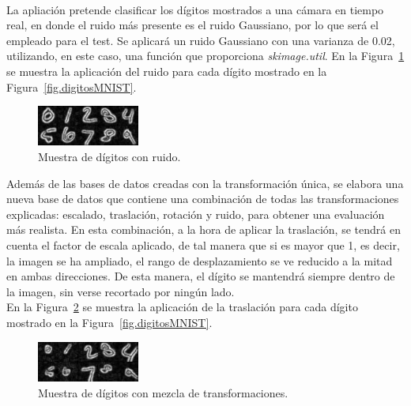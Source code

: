 \begin{description}
	\vspace{-10pt}
	\\
	La apliación pretende clasificar los dígitos mostrados a una cámara en tiempo real, en donde el ruido más presente es el ruido Gaussiano, por lo que será el empleado para el test. Se aplicará un ruido Gaussiano con  una varianza de 0.02, utilizando, en este caso, una función que proporciona \textit{skimage.util}. En la Figura~\ref{fig.ruido} se muestra la aplicación del ruido para cada dígito mostrado en la Figura~\ref{fig.digitosMNIST}.
	\begin{figure}[H]
		\begin{center}
			\includegraphics[width=0.3\textwidth]{figures/ruido}
			\caption{Muestra de dígitos con ruido.}
			\label{fig.ruido}
		\end{center}
	\end{figure}
\end{description}

Además de las bases de datos creadas con la transformación única, se elabora una nueva base de datos que contiene una combinación de todas las transformaciones explicadas: escalado, traslación, rotación y ruido, para obtener una evaluación más realista. En esta combinación, a la hora de aplicar la traslación, se tendrá en cuenta el factor de escala aplicado, de tal manera que si es mayor que 1, es decir, la imagen se ha ampliado, el rango de desplazamiento se ve reducido a la mitad en ambas direcciones. De esta manera, el dígito se mantendrá siempre dentro de la imagen, sin verse recortado por ningún lado.\\

En la Figura~\ref{fig.mix} se muestra la aplicación de la traslación para cada dígito mostrado en la Figura~\ref{fig.digitosMNIST}.
\begin{figure}[H]
	\begin{center}
		\includegraphics[width=0.3\textwidth]{figures/mix}
		\caption{Muestra de dígitos con mezcla de transformaciones.}
		\label{fig.mix}
	\end{center}
\end{figure}

